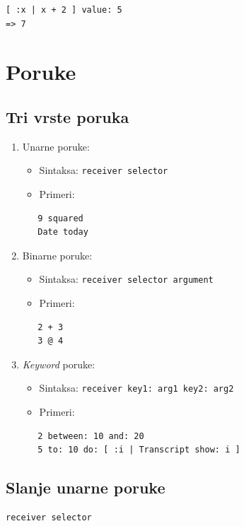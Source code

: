 \documentclass[presentation]{beamer}
\begin{document}
\begin{verbatim}
[ :x | x + 2 ] value: 5
=> 7
\end{verbatim}

\section{Poruke}
\label{sec:org2d0a022}
\subsection{Tri vrste poruka}
\label{sec:orgc9c382e}

\begin{enumerate}
\item Unarne poruke:
\begin{itemize}
\item Sintaksa: \texttt{receiver selector}
\item Primeri:
\end{itemize}
\begin{verbatim}
   9 squared
   Date today
\end{verbatim}

\item Binarne poruke:
\begin{itemize}
\item Sintaksa: \texttt{receiver selector argument}
\item Primeri:
\end{itemize}
\begin{verbatim}
   2 + 3
   3 @ 4
\end{verbatim}

\item \emph{Keyword} poruke:
\begin{itemize}
\item Sintaksa: \texttt{receiver key1: arg1 key2: arg2}
\item Primeri:
\end{itemize}
\begin{verbatim}
   2 between: 10 and: 20
   5 to: 10 do: [ :i | Transcript show: i ]
\end{verbatim}
\end{enumerate}

\subsection{Slanje unarne poruke}
\label{sec:org4adc49a}

\begin{verbatim}
receiver selector
\end{verbatim}
\end{document}

